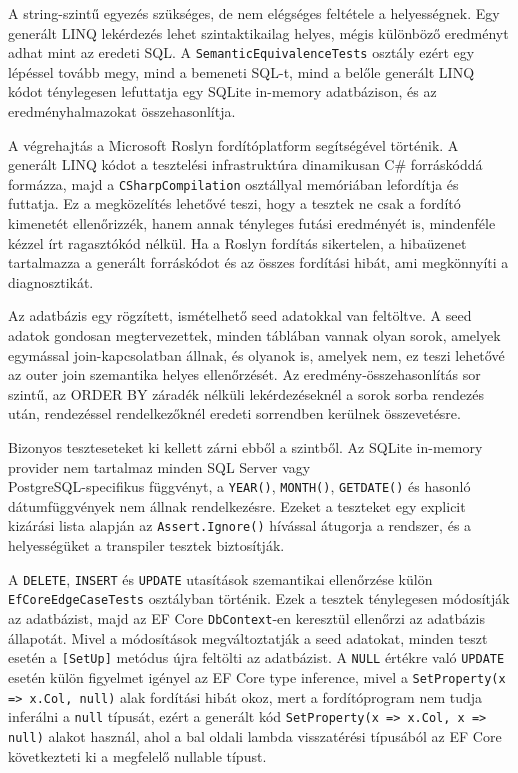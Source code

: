 \documentclass[a4paper,12pt]{article}
\begin{document}
A string-szintű egyezés szükséges, de nem elégséges feltétele a helyességnek. Egy generált LINQ lekérdezés lehet szintaktikailag helyes, mégis különböző eredményt adhat mint az eredeti SQL. A \texttt{SemanticEquivalenceTests} osztály ezért egy lépéssel tovább megy, mind a bemeneti SQL-t, mind a belőle generált LINQ kódot ténylegesen lefuttatja egy SQLite in-memory adatbázison, és az eredményhalmazokat összehasonlítja.

A végrehajtás a Microsoft Roslyn fordítóplatform segítségével történik. A generált LINQ kódot a tesztelési infrastruktúra dinamikusan C\# forráskóddá formázza, majd a \texttt{CSharpCompilation} osztállyal memóriában lefordítja és futtatja. Ez a megközelítés lehetővé teszi, hogy a tesztek ne csak a fordító kimenetét ellenőrizzék, hanem annak tényleges futási eredményét is, mindenféle kézzel írt ragasztókód nélkül. Ha a Roslyn fordítás sikertelen, a hibaüzenet tartalmazza a generált forráskódot és az összes fordítási hibát, ami megkönnyíti a diagnosztikát.

Az adatbázis egy rögzített, ismételhető seed adatokkal van feltöltve. A seed adatok gondosan megtervezettek, minden táblában vannak olyan sorok, amelyek egymással join-kapcsolatban állnak, és olyanok is, amelyek nem, ez teszi lehetővé az outer join szemantika helyes ellenőrzését. Az eredmény-összehasonlítás sor szintű, az ORDER BY záradék nélküli lekérdezéseknél a sorok sorba rendezés után, rendezéssel rendelkezőknél eredeti sorrendben kerülnek összevetésre.

Bizonyos teszteseteket ki kellett zárni ebből a szintből. Az SQLite in-memory provider nem tartalmaz minden SQL Server vagy \\PostgreSQL-specifikus függvényt, a \texttt{YEAR()}, \texttt{MONTH()}, \texttt{GETDATE()} és hasonló dátumfüggvények nem állnak rendelkezésre. Ezeket a teszteket egy explicit kizárási lista alapján az \texttt{Assert.Ignore()} hívással átugorja a rendszer, és a helyességüket a transpiler tesztek biztosítják.

A \texttt{DELETE}, \texttt{INSERT} és \texttt{UPDATE} utasítások szemantikai ellenőrzése külön \texttt{EfCoreEdgeCaseTests} osztályban történik. Ezek a tesztek ténylegesen módosítják az adatbázist, majd az EF Core \texttt{DbContext}-en keresztül ellenőrzi az adatbázis állapotát. Mivel a módosítások megváltoztatják a seed adatokat, minden teszt esetén a \texttt{[SetUp]} metódus újra feltölti az adatbázist. A \texttt{NULL} értékre való \texttt{UPDATE} esetén külön figyelmet igényel az EF Core type inference, mivel a \texttt{SetProperty(x => x.Col, null)} alak fordítási hibát okoz, mert a fordítóprogram nem tudja inferálni a \texttt{null} típusát, ezért a generált kód \texttt{SetProperty(x => x.Col, x => null)} alakot használ, ahol a bal oldali lambda visszatérési típusából az EF Core következteti ki a megfelelő nullable típust.
\end{document}
